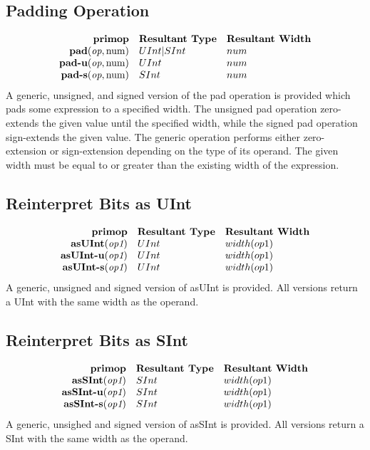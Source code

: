 \documentclass[12pt]{article}
\begin{document}
\subsection{Padding Operation}
\[
\begin{array}{rll}
\text{\bf primop} & \text{\bf Resultant Type} & \text{\bf Resultant Width} \\
\text{\bf pad}(\text{\em op}, \text{num})       & UInt|SInt & num \\
\text{\bf pad-u}(\text{\em op}, \text{num})     & UInt & num \\
\text{\bf pad-s}(\text{\em op}, \text{num})     & SInt & num \\
\end{array}
\]
A generic, unsigned, and signed version of the pad operation is provided which pads some expression to a specified width.
The unsigned pad operation zero-extends the given value until the specified width, while the signed pad operation sign-extends the given value.
The generic operation performs either zero-extension or sign-extension depending on the type of its operand.
The given width must be equal to or greater than the existing width of the expression. 

\subsection{Reinterpret Bits as UInt}
\[
\begin{array}{rll}
\text{\bf primop} & \text{\bf Resultant Type} & \text{\bf Resultant Width} \\
\text{\bf asUInt}(\text{\em op1})       & UInt & width(op1) \\
\text{\bf asUInt-u}(\text{\em op1})     & UInt & width(op1) \\
\text{\bf asUInt-s}(\text{\em op1})     & UInt & width(op1) \\
\end{array}
\]
A generic, unsigned and signed version of asUInt is provided. All versions return a UInt with the same width as the operand.

\subsection{Reinterpret Bits as SInt}
\[
\begin{array}{rll}
\text{\bf primop} & \text{\bf Resultant Type} & \text{\bf Resultant Width} \\
\text{\bf asSInt}(\text{\em op1})       & SInt & width(op1) \\
\text{\bf asSInt-u}(\text{\em op1})     & SInt & width(op1) \\
\text{\bf asSInt-s}(\text{\em op1})     & SInt & width(op1) \\
\end{array}
\]
A generic, unsighed and signed version of asSInt is provided. All versions return a SInt with the same width as the operand.
\end{document}

